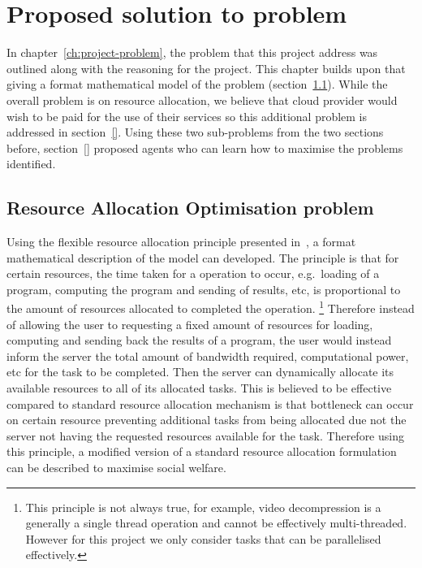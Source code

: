 \chapter{Proposed solution to problem}\label{ch:proposed-solution-to-problem}
In chapter~\ref{ch:project-problem}, the problem that this project address was outlined along with the reasoning for the
project. This chapter builds upon that giving a format mathematical model of the problem (section~\ref{sec:optimisation-problem}).
While the overall problem is on resource allocation, we believe that cloud provider would wish to be paid for the
use of their services so this additional problem is addressed in section~\ref{}. Using these two sub-problems from
the two sections before, section~\ref{} proposed agents who can learn how to maximise the problems identified.

\section{Resource Allocation Optimisation problem}\label{sec:optimisation-problem}
Using the flexible resource allocation principle presented in~\cite{FlexibleResourceAllocation}, a format mathematical
description of the model can developed. The principle is that for certain resources, the time taken for a operation to occur,
e.g.\ loading of a program, computing the program and sending of results, etc, is proportional to the amount of
resources allocated to completed the operation.
\footnote{This principle is not always true, for example, video decompression is a generally a single
thread operation and cannot be effectively multi-threaded. However for this project we only consider tasks
that can be parallelised effectively.}
Therefore instead of allowing the user to requesting a fixed amount of resources for loading, computing and sending back
the results of a program, the user would instead inform the server the total amount of bandwidth required,
computational power, etc for the task to be completed. Then the server can dynamically allocate its available resources
to all of its allocated tasks.
This is believed to be effective compared to standard resource allocation mechanism is that bottleneck can occur on
certain resource preventing additional tasks from being allocated due not the server not having the requested resources
available for the task.
Therefore using this principle, a modified version of a standard resource allocation formulation can be described
to maximise social welfare.


